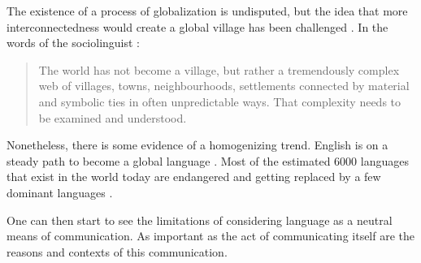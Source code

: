 \documentclass[../thesis.tex]{subfiles}
\begin{document}
The existence of a process of globalization is undisputed, but the idea that more
interconnectedness would create a global village has been challenged
\cite{NorrisCosmopolitanCommunications2009,BlommaertSociolinguisticsGlobalization2010}.
In the words of the sociolinguist
:

\begin{quote}
  The world has not become a village, but rather a tremendously complex web of villages,
  towns, neighbourhoods, settlements connected by material and symbolic ties in often
  unpredictable ways. That complexity needs to be examined and understood.
  \cite{BlommaertSociolinguisticsGlobalization2010}
\end{quote}
 
Nonetheless, there is some evidence of a homogenizing trend. English is on a steady path
to become a global language \cite{CrystalEnglishGlobal2010}. Most of the estimated
\SI{6000}{} languages that exist in the world today are endangered
\cite{CrystalLanguageDeath2000,GrenobleEndangeredLanguages1998,KraussWorldLanguages1992}
and getting replaced by a few dominant languages
\cite{GrilloDominantLanguages1989,WardhaughLanguagesCompetition1987}.



One can then start to see the limitations of considering language as a neutral means of
communication. As important as the act of communicating itself are the reasons and
contexts of this communication.



\end{document}
